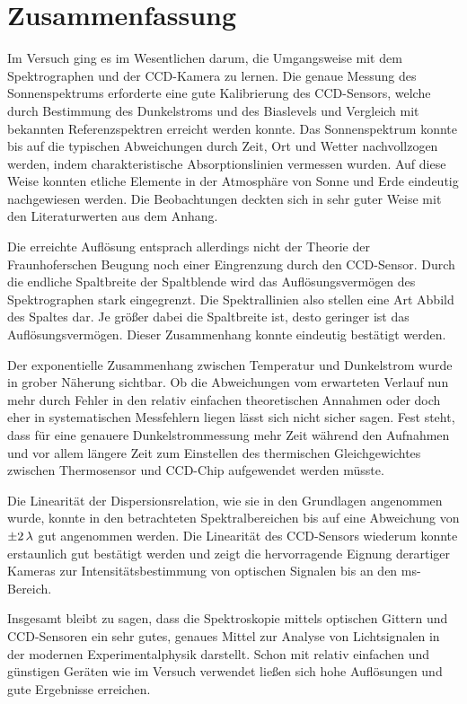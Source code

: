 \section{Zusammenfassung} %
\label{sec:zusammenfassung}

	Im Versuch ging es im Wesentlichen darum, die Umgangsweise mit dem Spektrographen und der CCD-Kamera zu lernen.
	Die genaue Messung des Sonnenspektrums erforderte eine gute Kalibrierung des CCD-Sensors, welche durch Bestimmung des Dunkelstroms und des Biaslevels und Vergleich mit bekannten Referenzspektren erreicht werden konnte.
	Das Sonnenspektrum konnte bis auf die typischen Abweichungen durch Zeit, Ort und Wetter nachvollzogen werden, indem charakteristische Absorptionslinien vermessen wurden.
	Auf diese Weise konnten etliche Elemente in der Atmosphäre von Sonne und Erde eindeutig nachgewiesen werden.
	Die Beobachtungen deckten sich in sehr guter Weise mit den Literaturwerten aus dem Anhang.

	Die erreichte Auflösung entsprach allerdings nicht der Theorie der Fraunhoferschen Beugung noch einer Eingrenzung durch den CCD-Sensor.
	Durch die endliche Spaltbreite der Spaltblende wird das Auflösungsvermögen des Spektrographen stark eingegrenzt.
	Die Spektrallinien also stellen eine Art Abbild des Spaltes dar.
	Je größer dabei die Spaltbreite ist, desto geringer ist das Auflösungsvermögen.
	Dieser Zusammenhang konnte eindeutig bestätigt werden.

	Der exponentielle Zusammenhang zwischen Temperatur und Dunkelstrom wurde in grober Näherung sichtbar.
	Ob die Abweichungen vom erwarteten Verlauf nun mehr durch Fehler in den relativ einfachen theoretischen Annahmen oder doch eher in systematischen Messfehlern liegen lässt sich nicht sicher sagen. 
	Fest steht, dass für eine genauere Dunkelstrommessung mehr Zeit während den Aufnahmen und vor allem längere Zeit zum Einstellen des thermischen Gleichgewichtes zwischen Thermosensor und CCD-Chip aufgewendet werden müsste.

	Die Linearität der Dispersionsrelation, wie sie in den Grundlagen angenommen wurde, konnte in den betrachteten Spektralbereichen bis auf eine Abweichung von $\pm 2\, \text{$\lambda$}$ gut angenommen werden.
	Die Linearität des CCD-Sensors wiederum konnte erstaunlich gut bestätigt werden und zeigt die hervorragende Eignung derartiger Kameras zur Intensitätsbestimmung von optischen Signalen bis an den ms-Bereich.

	Insgesamt bleibt zu sagen, dass die Spektroskopie mittels optischen Gittern und CCD-Sensoren ein sehr gutes, genaues Mittel zur Analyse von Lichtsignalen in der modernen Experimentalphysik darstellt.
	Schon mit relativ einfachen und günstigen Geräten wie im Versuch verwendet ließen sich hohe Auflösungen und gute Ergebnisse erreichen. 


